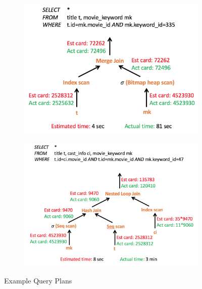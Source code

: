 \documentclass{article}
\begin{document}
	\begin{figure}
		\begin{subfigure}{.5\linewidth}
			\centering
			\includegraphics[scale=0.45]{./figs/1a.png}
			\label{fig:query1}
		\end{subfigure}
	\begin{subfigure}{.5\linewidth}
		\centering
		\includegraphics[scale=0.38]{./figs/1b.png}
		\label{fig:query2}
	\end{subfigure}
	\caption{Example Query Plans}
	\end{figure}
\end{document}
